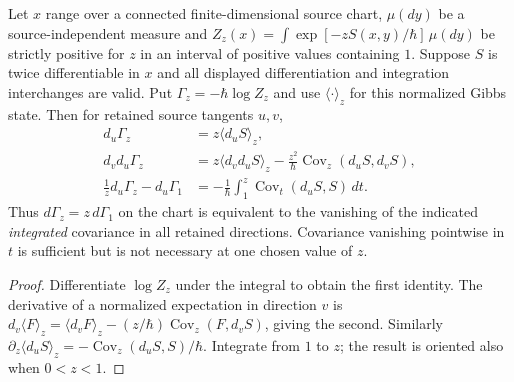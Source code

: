 \documentclass[12pt,a4paper]{article}
\begin{document}
\begin{proposition}
\label{p3e:prop:v358-finite-reduction-covariance}
Let $x$ range over a connected finite-dimensional source chart,
$\mu(dy)$ be a source-independent measure and
$Z_z(x)=\int \exp[-zS(x,y)/\hbar]\,\mu(dy)$ be strictly positive for
$z$ in an interval of positive values containing $1$.  Suppose
$S$ is twice differentiable in $x$ and all displayed differentiation
and integration interchanges are valid.  Put
$\Gamma_z=-\hbar\log Z_z$ and use $\langle\cdot\rangle_z$
for this normalized Gibbs state.  Then for retained source tangents
$u,v$,
\begin{align}
 d_u\Gamma_z&=z\langle d_uS\rangle_z,\label{p3e:eq:v358-quantum-first}\\
 d_vd_u\Gamma_z&=z\langle d_vd_uS\rangle_z
  -\frac{z^2}{\hbar}\operatorname{Cov}_z(d_uS,d_vS),
  \label{p3e:eq:v358-quantum-second}\\
 \frac1z d_u\Gamma_z-d_u\Gamma_1
  &=-\frac1\hbar\int_1^z\operatorname{Cov}_t(d_uS,S)\,dt.
  \label{p3e:eq:v358-covariance-obstruction}
\end{align}
Thus $d\Gamma_z=z\,d\Gamma_1$ on the chart is equivalent to the
vanishing of the indicated \emph{integrated} covariance in all retained
directions.  Covariance vanishing pointwise in $t$ is sufficient but
is not necessary at one chosen value of $z$.
\end{proposition}
\begin{proof}
Differentiate $\log Z_z$ under the integral to obtain the first
identity.  The derivative of a normalized expectation in direction $v$
is $d_v\langle F\rangle_z=\langle d_vF\rangle_z-
(z/\hbar)\operatorname{Cov}_z(F,d_vS)$, giving the second.
Similarly $\partial_z\langle d_uS\rangle_z=
-\operatorname{Cov}_z(d_uS,S)/\hbar$.  Integrate from $1$ to $z$;
the result is oriented also when $0<z<1$.
\end{proof}
\end{document}
